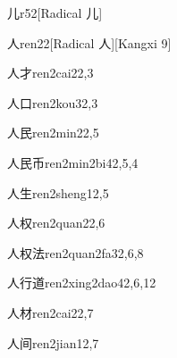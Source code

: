 \begin{verbete}{儿}{r5}{2}[Radical 儿]
\end{verbete}

\begin{verbete}{人}{ren2}{2}[Radical 人][Kangxi 9]
\end{verbete}

\begin{verbete}{人才}{ren2cai2}{2,3}
\end{verbete}

\begin{verbete}{人口}{ren2kou3}{2,3}
\end{verbete}

\begin{verbete}{人民}{ren2min2}{2,5}
\end{verbete}

\begin{verbete}{人民币}{ren2min2bi4}{2,5,4}
\end{verbete}

\begin{verbete}{人生}{ren2sheng1}{2,5}
\end{verbete}

\begin{verbete}{人权}{ren2quan2}{2,6}
\end{verbete}

\begin{verbete}{人权法}{ren2quan2fa3}{2,6,8}
\end{verbete}

\begin{verbete}{人行道}{ren2xing2dao4}{2,6,12}
\end{verbete}

\begin{verbete}{人材}{ren2cai2}{2,7}
\end{verbete}

\begin{verbete}{人间}{ren2jian1}{2,7}
\end{verbete}

